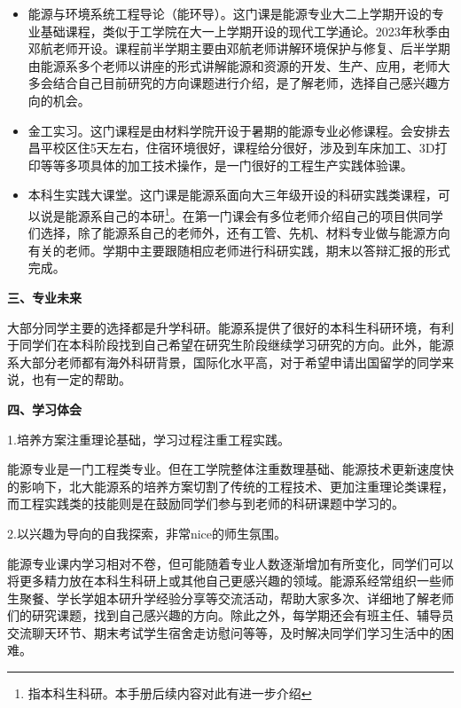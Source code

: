 \documentclass[11pt,oneside]{book}
\begin{document}
\begin{itemize}
	\item 能源与环境系统工程导论（能环导）。这门课是能源专业大二上学期开设的专业基础课程，类似于工学院在大一上学期开设的现代工学通论。2023年秋季由邓航老师开设。课程前半学期主要由邓航老师讲解环境保护与修复、后半学期由能源系多个老师以讲座的形式讲解能源和资源的开发、生产、应用，老师大多会结合自己目前研究的方向课题进行介绍，是了解老师，选择自己感兴趣方向的机会。
	
	\item 金工实习。这门课程是由材料学院开设于暑期的能源专业必修课程。会安排去昌平校区住5天左右，住宿环境很好，课程给分很好，涉及到车床加工、3D打印等等多项具体的加工技术操作，是一门很好的工程生产实践体验课。
	
	\item 本科生实践大课堂。这门课是能源系面向大三年级开设的科研实践类课程，可以说是能源系自己的本研\footnote{指本科生科研。本手册后续内容对此有进一步介绍}。在第一门课会有多位老师介绍自己的项目供同学们选择，除了能源系自己的老师外，还有工管、先机、材料专业做与能源方向有关的老师。学期中主要跟随相应老师进行科研实践，期末以答辩汇报的形式完成。
	
\end{itemize}

\textbf{三、专业未来}

大部分同学主要的选择都是升学科研。能源系提供了很好的本科生科研环境，有利于同学们在本科阶段找到自己希望在研究生阶段继续学习研究的方向。此外，能源系大部分老师都有海外科研背景，国际化水平高，对于希望申请出国留学的同学来说，也有一定的帮助。

\vspace{10pt}

\textbf{四、学习体会}

1.培养方案注重理论基础，学习过程注重工程实践。

能源专业是一门工程类专业。但在工学院整体注重数理基础、能源技术更新速度快的影响下，北大能源系的培养方案切割了传统的工程技术、更加注重理论类课程，而工程实践类的技能则是在鼓励同学们参与到老师的科研课题中学习的。

\vspace{10pt}

2.以兴趣为导向的自我探索，非常nice的师生氛围。

能源专业课内学习相对不卷，但可能随着专业人数逐渐增加有所变化，同学们可以将更多精力放在本科生科研上或其他自己更感兴趣的领域。能源系经常组织一些师生聚餐、学长学姐本研升学经验分享等交流活动，帮助大家多次、详细地了解老师们的研究课题，找到自己感兴趣的方向。除此之外，每学期还会有班主任、辅导员交流聊天环节、期末考试学生宿舍走访慰问等等，及时解决同学们学习生活中的困难。
\end{document}
